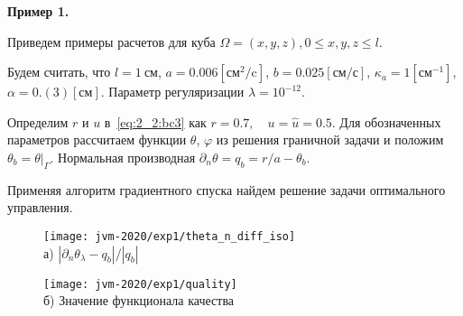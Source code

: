 \begin{frame}
    \textbf{Пример 1.}


    Приведем примеры расчетов для куба $\Omega = {(x, y, z), 0 \leq x,y,z \leq l}$.

    Будем считать, что $l=1~\text{см}$, $a = 0.006[\text{см}^2/\text{c}]$,
    $b=0.025[\text{см}/\text{с}]$, $\kappa_a=1[\text{см}^{-1}]$, $\alpha = 0.(3)[\text{см}]$.
    Параметр регуляризации $\lambda=10^{-12}$.

    Определим $r$ и $u$ в~\eqref{eq:2_2:bc3} как $r = 0.7, \quad u = \hat u = 0.5$.
    Для обозначенных параметров рассчитаем функции $\theta$, $\varphi$ из решения граничной задачи
    и положим $\theta_b = \theta|_\Gamma$.
    Нормальная производная $\partial_n \theta = q_b = r / a - \theta_b$.

    Применяя алгоритм градиентного спуска найдем решение задачи оптимального управления.
    \begin{figure}[h!t]
        \begin{minipage}[b][][b]{0.49\linewidth}
            \centering
            \texttt{[image: jvm-2020/exp1/theta\_n\_diff\_iso]}
            \\ а) $|\partial_n\theta_\lambda-q_b|/|q_b|$
        \end{minipage}
        \hfill
        \begin{minipage}[b][][b]{0.49\linewidth}
            \centering
            \texttt{[image: jvm-2020/exp1/quality]}
            \\ б) Значение функционала качества
        \end{minipage}
        \label{fig:4_4:0}
    \end{figure}
\end{frame}

